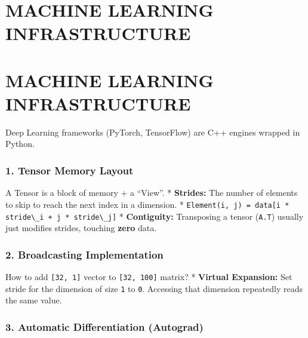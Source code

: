 \hypertarget{machine-learning-infrastructure}{%
\chapter{MACHINE LEARNING
INFRASTRUCTURE}\label{machine-learning-infrastructure}}

\hypertarget{machine-learning-infrastructure-1}{%
\chapter{MACHINE LEARNING
INFRASTRUCTURE}\label{machine-learning-infrastructure-1}}

Deep Learning frameworks (PyTorch, TensorFlow) are C++ engines wrapped
in Python.

\hypertarget{tensor-memory-layout}{%
\subsection{1. Tensor Memory Layout}\label{tensor-memory-layout}}

A Tensor is a block of memory + a ``View''. * \textbf{Strides:} The
number of elements to skip to reach the next index in a dimension. *
\passthrough{\lstinline!Element(i, j) = data[i * stride\_i + j * stride\_j]!}
* \textbf{Contiguity:} Transposing a tensor
(\passthrough{\lstinline!A.T!}) usually just modifies strides, touching
\textbf{zero} data.

\hypertarget{broadcasting-implementation}{%
\subsection{2. Broadcasting
Implementation}\label{broadcasting-implementation}}

How to add \passthrough{\lstinline![32, 1]!} vector to
\passthrough{\lstinline![32, 100]!} matrix? * \textbf{Virtual
Expansion:} Set stride for the dimension of size
\passthrough{\lstinline!1!} to \passthrough{\lstinline!0!}. Accessing
that dimension repeatedly reads the same value.

\hypertarget{automatic-differentiation-autograd}{%
\subsection{3. Automatic Differentiation
(Autograd)}\label{automatic-differentiation-autograd}}

